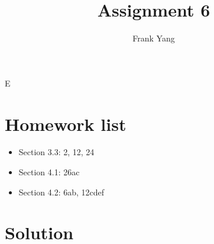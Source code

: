 E\documentclass[a4paper]{article}
\title{Assignment 6}
\author{Frank Yang}
\begin{document}
\maketitle
\section{Homework list}

\begin{itemize}

\item Section 3.3:  2, 12, 24

\item Section 4.1:  26ac

\item Section 4.2:  6ab, 12cdef

\end{itemize}

\section{Solution}
\end{document}
